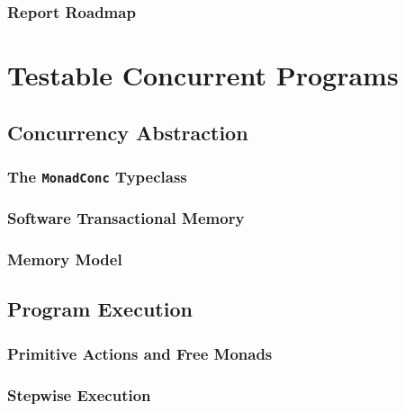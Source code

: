\documentclass[openright, dottedtoc, headinclude, footinclude=true, a4paper, numbers=noenddot]{scrreprt}
\begin{document}
  \section{Report Roadmap}
  \label{sec:intro-roadmap}
  

\part{Testable Concurrent Programs}
\label{part:testable}

\null\clearpage
\chapter{Concurrency Abstraction}
\label{chap:abstraction}


  \section{The \texttt{MonadConc} Typeclass}
  \label{sec:abstraction-typeclass}
  

  \section{Software Transactional Memory}
  \label{sec:abstraction-stm}
  

  \section{Memory Model}
  \label{sec:abstraction-mem}
  

\null\clearpage
\chapter{Program Execution}
\label{chap:execution}


  \section{Primitive Actions and Free Monads}
  \label{sec:execution-primops}
  

  \section{Stepwise Execution}
  \label{sec:execution-stepwise}
  
\end{document}
